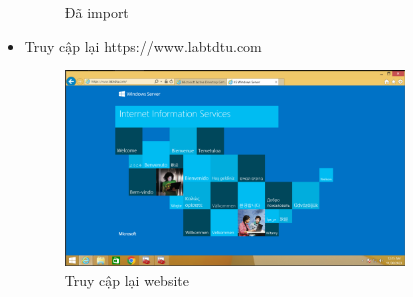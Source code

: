 \documentclass[13pt]{report}
\begin{document}
\begin{itemize}
\begin{figure}[htp]
			\caption{Đã import}
		\end{figure}
		\item Truy cập lại https://www.labtdtu.com
		\begin{figure}[htp]
			\centering
			\includegraphics[width=0.85\textwidth]{image/PowerShell/Test/7.png}
			\caption{Truy cập lại website}
		\end{figure}
	\end{itemize}
\end{document}
